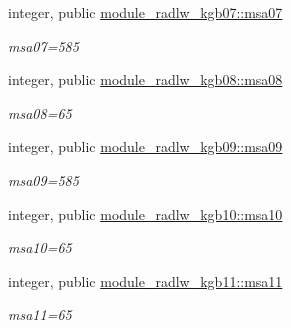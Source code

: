 \begin{DoxyCompactItemize}
\mbox{\label{namespacemodule__radlw__kgb07_a0acb84a6b261fc00f1765707844c32f2}} 
integer, public \hyperlink{namespacemodule__radlw__kgb07_a0acb84a6b261fc00f1765707844c32f2}{module\+\_\+radlw\+\_\+kgb07\+::msa07}
\begin{DoxyCompactList}\small\item\em msa07=585 \end{DoxyCompactList}\item 
\mbox{\label{namespacemodule__radlw__kgb08_a74e4bd8f4b00d0ff6bae1a39d9bddd3b}} 
integer, public \hyperlink{namespacemodule__radlw__kgb08_a74e4bd8f4b00d0ff6bae1a39d9bddd3b}{module\+\_\+radlw\+\_\+kgb08\+::msa08}
\begin{DoxyCompactList}\small\item\em msa08=65 \end{DoxyCompactList}\item 
\mbox{\label{namespacemodule__radlw__kgb09_ab739f0acab23f3140067506b396b3717}} 
integer, public \hyperlink{namespacemodule__radlw__kgb09_ab739f0acab23f3140067506b396b3717}{module\+\_\+radlw\+\_\+kgb09\+::msa09}
\begin{DoxyCompactList}\small\item\em msa09=585 \end{DoxyCompactList}\item 
\mbox{\label{namespacemodule__radlw__kgb10_a2305b922082d1cc367276b636f09fb6c}} 
integer, public \hyperlink{namespacemodule__radlw__kgb10_a2305b922082d1cc367276b636f09fb6c}{module\+\_\+radlw\+\_\+kgb10\+::msa10}
\begin{DoxyCompactList}\small\item\em msa10=65 \end{DoxyCompactList}\item 
\mbox{\label{namespacemodule__radlw__kgb11_afd15a7b87b3d49c53c12e023c604b360}} 
integer, public \hyperlink{namespacemodule__radlw__kgb11_afd15a7b87b3d49c53c12e023c604b360}{module\+\_\+radlw\+\_\+kgb11\+::msa11}
\begin{DoxyCompactList}\small\item\em msa11=65 \end{DoxyCompactList}\item 

\end{DoxyCompactItemize}
